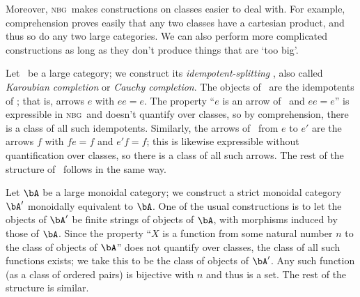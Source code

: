 \documentclass{amsart}
\def\nbg{\textsc{nbg}}
\begin{document}
Moreover, \nbg\ makes constructions on classes easier to deal with.
For example, comprehension proves easily that any two classes have a
cartesian product, and thus so do any two large categories.  We can
also perform more complicated constructions as long as they don't
produce things that are `too big'.

\begin{eg}
  Let \bA\ be a large category; we construct its
  \emph{idempotent-splitting} \bAbar, also called \emph{Karoubian
    completion} or \emph{Cauchy completion}.  The objects of \bAbar\
  are the idempotents of \bA; that is, arrows $e$ with $ee=e$.  The
  property ``$e$ is an arrow of \bA\ and $ee=e$'' is expressible in
  \nbg\ and doesn't quantify over classes, so by comprehension, there is
  a class of all such idempotents.  Similarly, the arrows of \bAbar\
  from $e$ to $e'$ are the arrows $f$ with $fe=f$ and $e'f=f$; this is
  likewise expressible without quantification over classes, so there
  is a class of all such arrows.  The rest of the structure of \bAbar\
  follows in the same way.
\end{eg}

\begin{eg}
  Let $\bA$ be a large monoidal category; we construct a strict
  monoidal category $\bA'$ monoidally equivalent to $\bA$.  One of the
  usual constructions is to let the objects of $\bA'$ be finite
  strings of objects of $\bA$, with morphisms induced by those of
  $\bA$.  Since the property ``$X$ is a function from some natural
  number $n$ to the class of objects of $\bA$'' does not quantify over
  classes, the class of all such functions exists; we take this to be
  the class of objects of $\bA'$.  Any such function (as a class of
  ordered pairs) is bijective with $n$ and thus is a set.  The rest of
  the structure is similar.
\end{eg}
\end{document}
